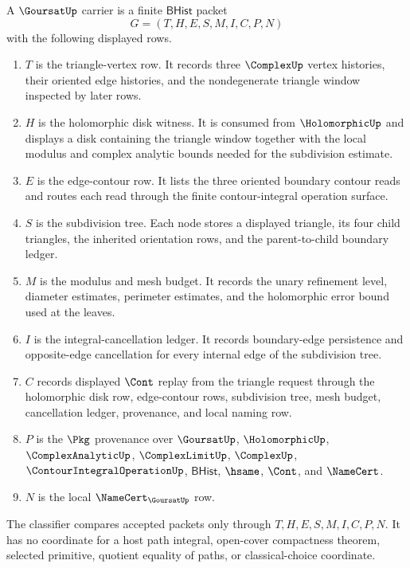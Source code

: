 \begin{definition}
\label{def:goursat-carrier}
A $\GoursatUp$ carrier is a finite $\mathsf{BHist}$ packet
$$
G=(T,H,E,S,M,I,C,P,N)
$$
with the following displayed rows.
\begin{enumerate}
\item $T$ is the triangle-vertex row. It records three $\ComplexUp$ vertex histories, their oriented edge histories, and the nondegenerate triangle window inspected by later rows.
\item $H$ is the holomorphic disk witness. It is consumed from $\HolomorphicUp$ and displays a disk containing the triangle window together with the local modulus and complex analytic bounds needed for the subdivision estimate.
\item $E$ is the edge-contour row. It lists the three oriented boundary contour reads and routes each read through the finite contour-integral operation surface.
\item $S$ is the subdivision tree. Each node stores a displayed triangle, its four child triangles, the inherited orientation rows, and the parent-to-child boundary ledger.
\item $M$ is the modulus and mesh budget. It records the unary refinement level, diameter estimates, perimeter estimates, and the holomorphic error bound used at the leaves.
\item $I$ is the integral-cancellation ledger. It records boundary-edge persistence and opposite-edge cancellation for every internal edge of the subdivision tree.
\item $C$ records displayed $\Cont$ replay from the triangle request through the holomorphic disk row, edge-contour rows, subdivision tree, mesh budget, cancellation ledger, provenance, and local naming row.
\item $P$ is the $\Pkg$ provenance over $\GoursatUp$, $\HolomorphicUp$, $\ComplexAnalyticUp$, $\ComplexLimitUp$, $\ComplexUp$, $\ContourIntegralOperationUp$, $\mathsf{BHist}$, $\hsame$, $\Cont$, and $\NameCert$.
\item $N$ is the local $\NameCert_{\GoursatUp}$ row.
\end{enumerate}
The classifier compares accepted packets only through $T,H,E,S,M,I,C,P,N$. It has no coordinate for a host path integral, open-cover compactness theorem, selected primitive, quotient equality of paths, or classical-choice coordinate.
\end{definition}


